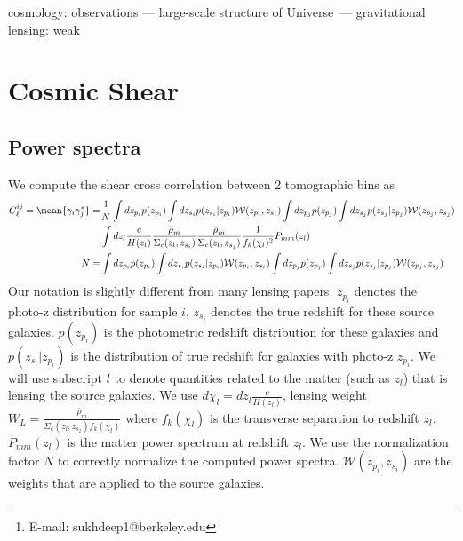 \documentclass[a4paper,fleqn,usenatbib]{mnras}
\title[]{}
\author[S.~Singh et al.]{
   Sukhdeep Singh$^{1,2}$\thanks{E-mail: sukhdeep1@berkeley.edu},
\\
   $^{1}$ Berkeley Center for Cosmological Physics, Department of Physics, University of California, Berkeley, CA 94720, USA\\
   $^{2}$Lawrence Berkeley National Laboratory (LBNL),
Physics Division, Berkeley, CA 94720-8153, USA\\
}
\date{Accepted XXX. Received YYY; in original form ZZZ}
\begin{document}
\label{firstpage}
\pagerange{\pageref{firstpage}--\pageref{lastpage}}
\maketitle

\begin{abstract}
\end{abstract}

\begin{keywords}
cosmology: observations
  --- large-scale structure of Universe\ --- gravitational
  lensing: weak
\end{keywords}

\onecolumn
\section{Cosmic Shear}
	\subsection{Power spectra}
	We compute the shear cross correlation between 2 tomographic bins as
	\begin{align}
		C_{\ell}^{ij}=\mean{\gamma_i\gamma_j^*}=&\frac{1}{N}\int dz_{p_i} p(z_{p_i}) \int dz_{s_i} p(z_{s_i}|z_{p_i})\mathcal W(z_{p_i},z_{s_i})
		\int dz_{p_j} p(z_{p_j})\int dz_{s_j} p(z_{s_j}|z_{p_j})\mathcal W(z_{p_j},z_{s_j})\nonumber\\
		&\int dz_l \frac{c}{H(z_l)}\frac{\overline{\rho}_m}{\Sigma_c(z_l,z_{s_i})}\frac{\overline{\rho}_m}{\Sigma_c(z_l,z_{s_j})}
		\frac{1}{f_k(\chi_l)^2}P_{mm}(z_l)\\
		N=&\int dz_{p_i} p(z_{p_i})\int dz_{s_i} p(z_{s_i}|z_{p_i})\mathcal W(z_{p_i},z_{s_i})\int dz_{p_j} p(z_{p_j})\int dz_{s_j} p(z_{s_j}|z_{p_j})
			\mathcal W(z_{p_j},z_{s_j})
	\end{align}
	Our notation is slightly different from many lensing papers. $z_{p_i}$ denotes the photo-z distribution for sample $i$, $z_{s_i}$ denotes the true 
	redshift for these source galaxies. $p(z_{p_i})$ is the photometric redshift distribution for these galaxies and $p(z_{s_i}|z_{p_i})$ is the 
	distribution of true redshift for galaxies with photo-z $z_{p_i}$.
	We will use subscript $l$ to denote quantities related to the matter (such as $z_l$) that is lensing the 
	source galaxies. We use 
	$d\chi_l=dz_l \frac{c}{H(z_l)}$, lensing weight $W_L=\frac{\overline{\rho}_m}{\Sigma_c(z_l,z_{s_2})f_k(\chi_l)}$ where $f_k(\chi_l)$ is the transverse 
	separation to redshift $z_l$. $P_{mm}(z_l)$ is the matter power spectrum at redshift $z_l$. We use the normalization factor $N$ to correctly normalize 
	the computed power spectra. 
	$\mathcal W(z_{p_i},z_{s_i})$ are the weights that are applied to the source galaxies.
	
\end{document}
